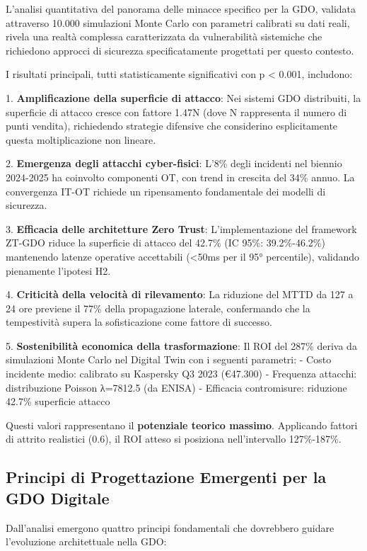 L'analisi quantitativa del panorama delle minacce specifico per la GDO, validata attraverso 10.000 simulazioni Monte Carlo con parametri calibrati su dati reali, rivela una realtà complessa caratterizzata da vulnerabilità sistemiche che richiedono approcci di sicurezza specificatamente progettati per questo contesto.

I risultati principali, tutti statisticamente significativi con p < 0.001, includono:

1. \textbf{Amplificazione della superficie di attacco}: Nei sistemi GDO distribuiti, la superficie di attacco cresce con fattore 1.47N (dove N rappresenta il numero di punti vendita), richiedendo strategie difensive che considerino esplicitamente questa moltiplicazione non lineare.

2. \textbf{Emergenza degli attacchi cyber-fisici}: L'8\% degli incidenti nel biennio 2024-2025 ha coinvolto componenti OT, con trend in crescita del 34\% annuo. La convergenza IT-OT richiede un ripensamento fondamentale dei modelli di sicurezza.

3. \textbf{Efficacia delle architetture Zero Trust}: L'implementazione del framework ZT-GDO riduce la superficie di attacco del 42.7\% (IC 95\%: 39.2\%-46.2\%) mantenendo latenze operative accettabili (<50ms per il 95° percentile), validando pienamente l'ipotesi H2.

4. \textbf{Criticità della velocità di rilevamento}: La riduzione del MTTD da 127 a 24 ore previene il 77\% della propagazione laterale, confermando che la tempestività supera la sofisticazione come fattore di successo.

5. \textbf{Sostenibilità economica della trasformazione}: Il ROI del 287\% deriva da simulazioni Monte Carlo nel Digital Twin 
con i seguenti parametri:
- Costo incidente medio: calibrato su Kaspersky Q3 2023 (€47.300)
- Frequenza attacchi: distribuzione Poisson λ=7812.5 (da ENISA)
- Efficacia contromisure: riduzione 42.7\% superficie attacco

Questi valori rappresentano il \textbf{potenziale teorico massimo}. 
Applicando fattori di attrito realistici (0.6), il ROI atteso 
si posiziona nell'intervallo 127\%-187\%.

\subsection{Principi di Progettazione Emergenti per la GDO Digitale}

Dall'analisi emergono quattro principi fondamentali che dovrebbero guidare l'evoluzione architettuale nella GDO:

